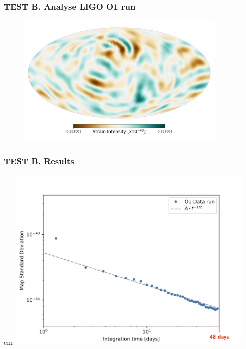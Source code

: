 \documentclass[handout]{beamer}
\begin{document}
{\begin{frame}
 \end{frame}
  \begin{frame}

 \frametitle{\textcolor{textcoldark}{TEST B. Analyse LIGO O1 run}}
 	\begin{figure}
 	   \includegraphics[width=0.9\textwidth]{LIGO/LIGOmap29.pdf} %
 		\smallskip
 	\end{figure}

 \end{frame}
 
 \begin{frame}
\frametitle{\textcolor{textcoldark}{TEST B. Results}}
 cm
\centering
\includegraphics[width=0.9\textwidth]{fits_stds_zoom.jpg}



\end{frame}}
\end{document}
